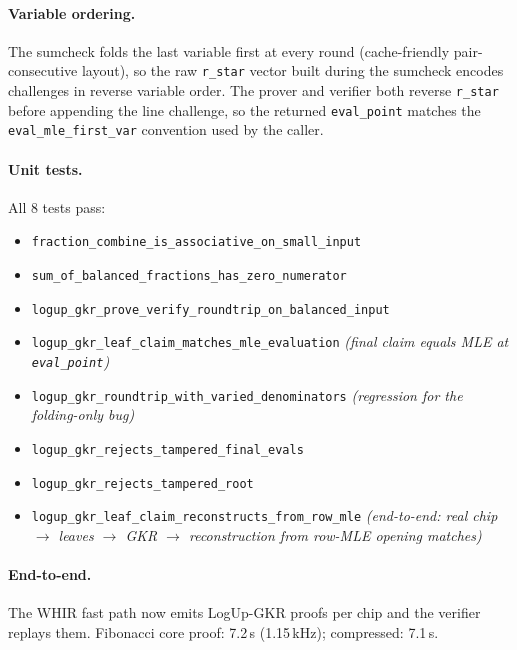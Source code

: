 \paragraph{Variable ordering.} The sumcheck folds the last variable
first at every round (cache-friendly pair-consecutive layout), so the
raw \texttt{r\_star} vector built during the sumcheck encodes challenges
in reverse variable order. The prover and verifier both reverse
\texttt{r\_star} before appending the line challenge, so the returned
\texttt{eval\_point} matches the \texttt{eval\_mle\_first\_var}
convention used by the caller.

\paragraph{Unit tests.} All 8 tests pass:
\begin{itemize}
  \item \texttt{fraction\_combine\_is\_associative\_on\_small\_input}
  \item \texttt{sum\_of\_balanced\_fractions\_has\_zero\_numerator}
  \item \texttt{logup\_gkr\_prove\_verify\_roundtrip\_on\_balanced\_input}
  \item \texttt{logup\_gkr\_leaf\_claim\_matches\_mle\_evaluation}
        \textit{(final claim equals MLE at \texttt{eval\_point})}
  \item \texttt{logup\_gkr\_roundtrip\_with\_varied\_denominators}
        \textit{(regression for the folding-only bug)}
  \item \texttt{logup\_gkr\_rejects\_tampered\_final\_evals}
  \item \texttt{logup\_gkr\_rejects\_tampered\_root}
  \item \texttt{logup\_gkr\_leaf\_claim\_reconstructs\_from\_row\_mle}
        \textit{(end-to-end: real chip $\to$ leaves $\to$ GKR $\to$
        reconstruction from row-MLE opening matches)}
\end{itemize}

\paragraph{End-to-end.} The WHIR fast path now emits LogUp-GKR proofs
per chip and the verifier replays them. Fibonacci core proof: 7.2\,s
(1.15\,kHz); compressed: 7.1\,s.

